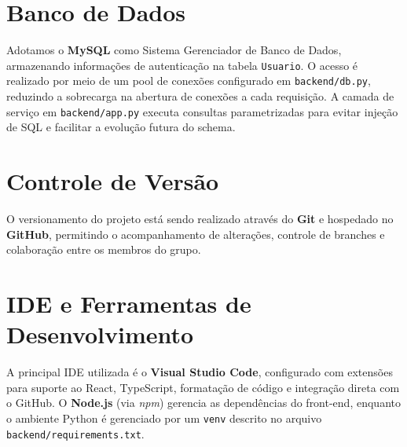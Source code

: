 \section{Banco de Dados}
Adotamos o \textbf{MySQL} como Sistema Gerenciador de Banco de Dados, armazenando informações de autenticação na tabela \texttt{Usuario}. O acesso é realizado por meio de um pool de conexões configurado em \texttt{backend/db.py}, reduzindo a sobrecarga na abertura de conexões a cada requisição. A camada de serviço em \texttt{backend/app.py} executa consultas parametrizadas para evitar injeção de SQL e facilitar a evolução futura do schema.

\section{Controle de Versão}
O versionamento do projeto está sendo realizado através do \textbf{Git} e hospedado no \textbf{GitHub}, permitindo o acompanhamento de alterações, controle de branches e colaboração entre os membros do grupo.

\section{IDE e Ferramentas de Desenvolvimento}
A principal IDE utilizada é o \textbf{Visual Studio Code}, configurado com extensões para suporte ao React, TypeScript, formatação de código e integração direta com o GitHub. O \textbf{Node.js} (via \textit{npm}) gerencia as dependências do front-end, enquanto o ambiente Python é gerenciado por um \texttt{venv} descrito no arquivo \texttt{backend/requirements.txt}.
